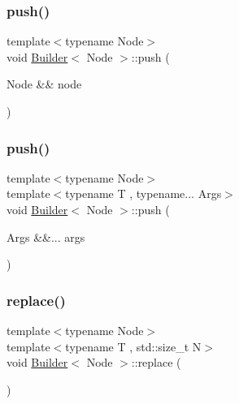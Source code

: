 \mbox{\label{class_builder_ab5d5a9c74592ca913ecc7f75cc85c264}} 
\subsubsection{\texorpdfstring{push()}{push()}\hspace{0.1cm}{\footnotesize\ttfamily [1/2]}}
{\footnotesize\ttfamily template$<$typename Node$>$ \\
void \hyperlink{class_builder}{Builder}$<$ Node $>$\+::push (\begin{DoxyParamCaption}\item[{Node \&\&}]{node }\end{DoxyParamCaption})\hspace{0.3cm}{\ttfamily [inline]}}

\mbox{\label{class_builder_a8dee6cb8313b1e43dfbb90fa22fdd66a}} 
\subsubsection{\texorpdfstring{push()}{push()}\hspace{0.1cm}{\footnotesize\ttfamily [2/2]}}
{\footnotesize\ttfamily template$<$typename Node$>$ \\
template$<$typename T , typename... Args$>$ \\
void \hyperlink{class_builder}{Builder}$<$ Node $>$\+::push (\begin{DoxyParamCaption}\item[{Args \&\&...}]{args }\end{DoxyParamCaption})\hspace{0.3cm}{\ttfamily [inline]}}

\mbox{\label{class_builder_a3b8f593df382e865b087d72355a4b5b2}} 
\subsubsection{\texorpdfstring{replace()}{replace()}\hspace{0.1cm}{\footnotesize\ttfamily [1/2]}}
{\footnotesize\ttfamily template$<$typename Node$>$ \\
template$<$typename T , std\+::size\+\_\+t N$>$ \\
void \hyperlink{class_builder}{Builder}$<$ Node $>$\+::replace (\begin{DoxyParamCaption}{ }\end{DoxyParamCaption})\hspace{0.3cm}{\ttfamily [inline]}}

